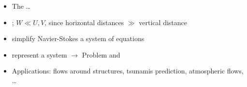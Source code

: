 \begin{frame}
\begin{multicols}{2}
\vfill\columnbreak

\begin{itemize}
\setlength\itemsep{2em}
\item<2->[] The \textbf{} \dots
\item<3-> ;  $ W \ll U,V $, since horizontal distances $\gg$ vertical distance 
\item<4-> simplify  Navier-Stokes  a  system of equations
\item<5-> represent a  system $\rightarrow$  Problem and 
\item<6-> Applications: {\small {} flows around structures, tsunamis prediction, atmospheric flows, \dots}
\end{itemize}
\end{multicols}

\end{frame}
\clearpage


